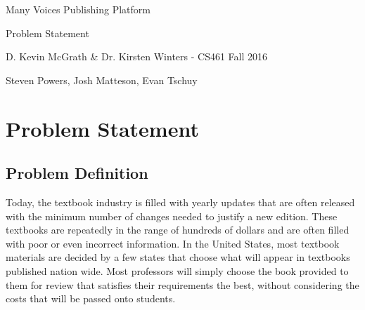 \documentclass[letterpaper, 10pt, draftclsnofoot, onecolumn]{IEEEtran}
\begin{document}
\begin{titlepage}
\centering
{\huge Many Voices Publishing Platform\par}
{\LARGE Problem Statement\par}
{\vspace{2mm}}
{\large D. Kevin McGrath \& Dr. Kirsten Winters -  CS461 Fall 2016\par}
{\large Steven Powers, Josh Matteson, Evan Tschuy\par}
{\vspace{10mm}}


\end{titlepage}

\vspace{1pc}
\section{Problem Statement}
\vspace{2pc}

\vspace{1pc}
\subsection{Problem Definition}
\vspace{1pc}

{\noindent Today, the textbook industry is filled with yearly updates that 
are often released with the minimum number of changes needed to 
justify a new edition. These textbooks are repeatedly in the range of 
hundreds of dollars and are often filled with poor or even incorrect 
information. 
In the United States, most textbook materials are decided by a few 
states that choose what will appear in textbooks published nation wide. 
Most professors will simply choose the book provided to them for 
review that satisfies their requirements the best, without considering 
the costs that will be passed onto students. \par}
\end{document}
